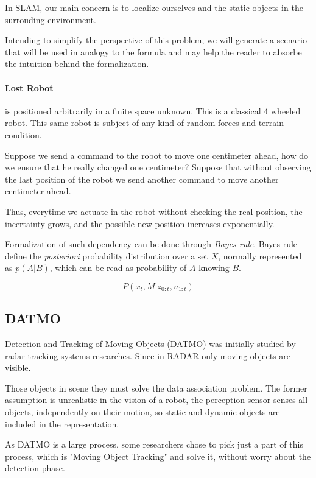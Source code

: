 In SLAM, our main concern is to localize ourselves and the static objects in the surrouding environment. 

Intending to simplify the perspective of this problem, we will generate a scenario that will be used in analogy to the formula and may help the reader to absorbe the intuition behind the formalization.

\paragraph*{Lost Robot} is positioned arbitrarily in a finite space unknown. This is a classical 4 wheeled robot. This same robot is subject of any kind of random forces and terrain condition. 

Suppose we send a command to the robot to move one centimeter ahead, how do we ensure that he really changed one centimeter? Suppose that without observing the last position of the robot we send another command to move another centimeter ahead. 

Thus, everytime we actuate in the robot without checking the real position, the incertainty grows, and the possible new position increases exponentially.

Formalization of such dependency can be done through \textit{Bayes rule}. Bayes rule define the \textit{posteriori} probability distribution over a set $X$, normally represented as $p(A | B)$, which can be read as probability of $A$ knowing $B$.

\begin{equation}
\label{jpd:discrete}
P(x_t,M | z_{0:t}, u_{1:t})
\end{equation}


\subsection{DATMO}

Detection and Tracking of Moving Objects (DATMO) was initially studied by radar tracking systems \cite{VU-2009-454238} researches. Since in RADAR only moving objects are visible.

Those objects in scene they must solve the data association problem. The former assumption is unrealistic in the vision of a robot, the perception sensor senses all objects, independently on their motion, so static and dynamic objects are included in the representation.

As DATMO is a large process, some researchers chose to pick just a part of this process, which is "Moving Object Tracking" and solve it, without worry about the detection phase.

